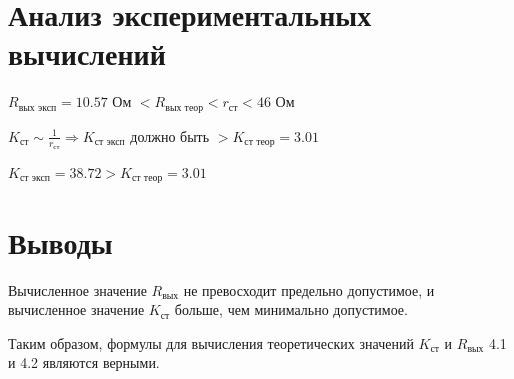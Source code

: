 \section{Анализ экспериментальных вычислений}

$R_\text{вых\ \ эксп} = 10.57 $ Ом $< R_\text{вых\ \ теор} < r_\text{ст} < 46$ Ом

$K_\text{ст} \sim \frac{1}{r_\text{ст}} \Rightarrow K_\text{ст\ \ эксп}$ должно быть $> K_\text{ст\ \ теор} = 3.01$

$K_\text{ст\ \ эксп} = 38.72 > K_\text{ст\ \ теор} = 3.01$

\section{Выводы}

Вычисленное значение $R_\text{вых}$ не превосходит предельно допустимое, и вычисленное значение $K_\text{ст}$ больше, чем минимально допустимое.

Таким образом, формулы для вычисления теоретических значений $K_\text{ст}$ и $R_\text{вых}$ 4.1 и 4.2 являются верными.


